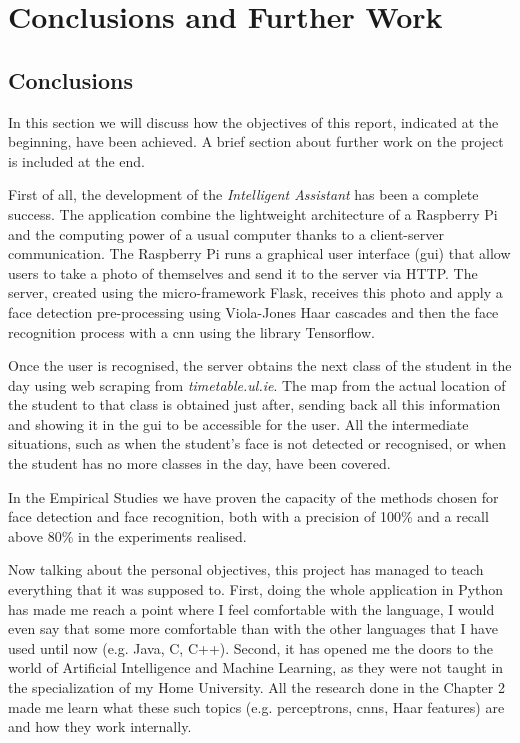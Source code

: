 \chapter{Conclusions and Further Work}
\label{ch:conclusions}

\section{Conclusions}
In this section we will discuss how the objectives of this report, indicated at the beginning, have been achieved. A brief section about further work on the project is included at the end.

First of all, the development of the \textit{Intelligent Assistant} has been a complete success. The application combine the lightweight architecture of a Raspberry Pi and the computing power of a usual computer thanks to a client-server communication. The Raspberry Pi runs a graphical user interface (\gls{gui}) that allow users to take a photo of themselves and send it to the server via HTTP. The server, created using the micro-framework Flask, receives this photo and apply a face detection pre-processing using Viola-Jones Haar cascades and then the face recognition process with a \gls{cnn} using the library Tensorflow.

Once the user is recognised, the server obtains the next class of the student in the day using web scraping from \textit{timetable.ul.ie}. The map from the actual location of the student to that class is obtained just after, sending back all this information and showing it in the \gls{gui} to be accessible for the user. All the intermediate situations, such as when the student's face is not detected or recognised, or when the student has no more classes in the day, have been covered. 

In the Empirical Studies we have proven the capacity of the methods chosen for face detection and face recognition, both with a precision of 100\% and a recall above 80\% in the experiments realised. 

Now talking about the personal objectives, this project has managed to teach everything that it was supposed to. First, doing the whole application in Python has made me reach a point where I feel comfortable with the language, I would even say that some more comfortable than with the other languages that I have used until now (e.g. Java, C, C++). Second, it has opened me the doors to the world of Artificial Intelligence and Machine Learning, as they were not taught in the specialization of my Home University. All the research done in the Chapter 2 made me learn what these such topics (e.g. perceptrons, \glspl{cnn}, Haar features) are and how they work internally.

